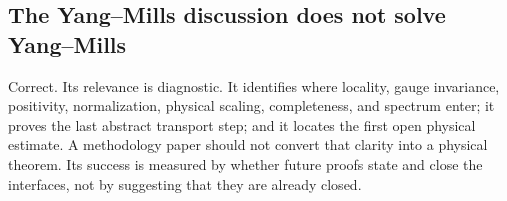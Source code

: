 \subsection{The Yang--Mills discussion does not solve Yang--Mills}

Correct.  Its relevance is diagnostic.  It identifies where locality, gauge
invariance, positivity, normalization, physical scaling, completeness, and
spectrum enter; it proves the last abstract transport step; and it locates the
first open physical estimate.  A methodology paper should not convert that
clarity into a physical theorem.  Its success is measured by whether future
proofs state and close the interfaces, not by suggesting that they are already
closed.
